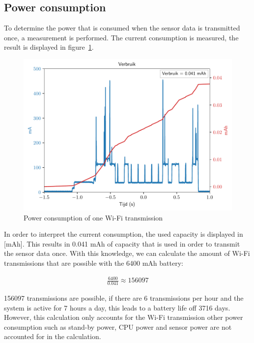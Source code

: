 \documentclass[11pt,a4paper]{article}
\begin{document}
\subsection{Power consumption}
To determine the power that is consumed when the sensor data is transmitted once, a measurement is performed. The current consumption is measured, the result is displayed in figure~\ref{fig:wifi_pwr}.
\begin{figure}[H]
	\centering
	\includegraphics[width=1.0\linewidth]{wifi_pwr.pdf}
	\caption{Power consumption of one Wi-Fi transmission}
	\label{fig:wifi_pwr}
\end{figure}
In order to interpret the current consumption, the used capacity is displayed in [mAh]. This results in 0.041 mAh of capacity that is used in order to transmit the sensor data once. With this knowledge, we can calculate the amount of Wi-Fi transmissions that are possible with the 6400 mAh battery:

\begin{gather*}
	\frac{6400}{0.041} \approx 156097
\end{gather*}

156097 transmissions are possible, if there are 6 transmissions per hour and the system is active for 7 hours a day, this leads to a battery life off 3716 days.  However, this calculation only accounts for the Wi-Fi transmission other power consumption such as stand-by power, CPU power and sensor power are not accounted for in the calculation. 
\end{document}
